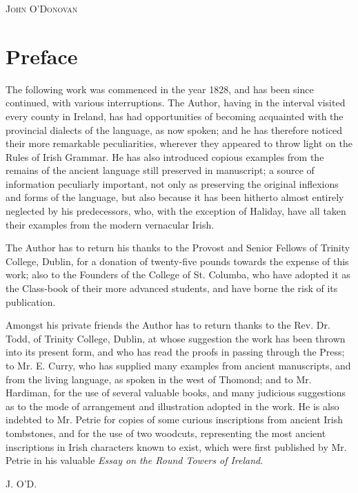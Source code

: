 \documentclass[11pt,oneside]{memoir}
\begin{document}
\begin{flushright}
    \vspace*{0.3cm}
    {\LARGE \textsc{John O'Donovan}}
\end{flushright}

\chapter*{Preface}
The following work was commenced in the year 1828, and has been since continued, with various interruptions.
The Author, having in the interval visited every county in Ireland, has had opportunities of becoming acquainted with the provincial dialects of the language, as now spoken; and he has therefore noticed their more remarkable peculiarities, wherever they appeared to throw light on the Rules of Irish Grammar.
He has also introduced copious examples from the remains of the ancient language still preserved in manuscript; a source of information peculiarly important, not only as preserving the original inflexions and forms of the language, but also because it has been hitherto almost entirely neglected by his predecessors, who, with the exception of Haliday, have all taken their examples from the modern vernacular Irish.

The Author has to return his thanks to the Provost and Senior Fellows of Trinity College, Dublin, for a donation of twenty-five pounds towards the expense of this work; also to the Founders of the College of St. Columba, who have adopted it as the Class-book of their more advanced students, and have borne the risk of its publication. 

Amongst his private friends the Author has to return thanks to the Rev. Dr. Todd, of Trinity College, Dublin, at whose suggestion the work has been thrown into its present form, and who has read the proofs in passing through the Press;
to Mr. E. Curry, who has supplied many examples from ancient manuscripts, and from the living language, as spoken in the west of Thomond;
and to Mr. Hardiman, for the use of several valuable books, and many judicious suggestions as to the mode of arrangement and illustration adopted in the work. 
He is also indebted to Mr. Petrie for copies of some curious inscriptions from ancient Irish tombstones, and for the use of two woodcuts, representing the most ancient inscriptions in Irish characters known to exist, which were first published by Mr. Petrie in his valuable \textit{Essay on the Round Towers of Ireland}.

\begin{flushright}
J. O'D.
\end{flushright}
\end{document}
